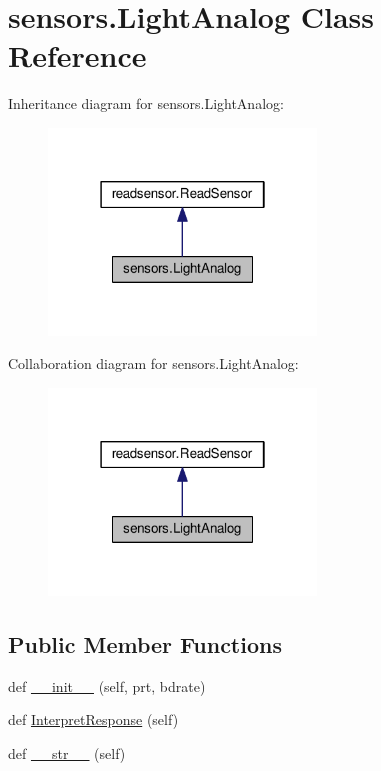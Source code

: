 \hypertarget{classsensors_1_1LightAnalog}{}\section{sensors.\+Light\+Analog Class Reference}
\label{classsensors_1_1LightAnalog}


Inheritance diagram for sensors.\+Light\+Analog\+:\nopagebreak
\begin{figure}[H]
\begin{center}
\leavevmode
\includegraphics[width=202pt]{classsensors_1_1LightAnalog__inherit__graph}
\end{center}
\end{figure}


Collaboration diagram for sensors.\+Light\+Analog\+:\nopagebreak
\begin{figure}[H]
\begin{center}
\leavevmode
\includegraphics[width=202pt]{classsensors_1_1LightAnalog__coll__graph}
\end{center}
\end{figure}
\subsection*{Public Member Functions}
\begin{DoxyCompactItemize}
\item 
def \hyperlink{classsensors_1_1LightAnalog_a40c88addc7882f729ce0e3564f9096a3}{\+\_\+\+\_\+init\+\_\+\+\_\+} (self, prt, bdrate)
\item 
def \hyperlink{classsensors_1_1LightAnalog_acdc03ffb833d9f66e64261e1c6414e88}{Interpret\+Response} (self)
\item 
def \hyperlink{classsensors_1_1LightAnalog_a9fbb4a2fd317e5229302b5d146204e43}{\+\_\+\+\_\+str\+\_\+\+\_\+} (self)
\end{DoxyCompactItemize}
